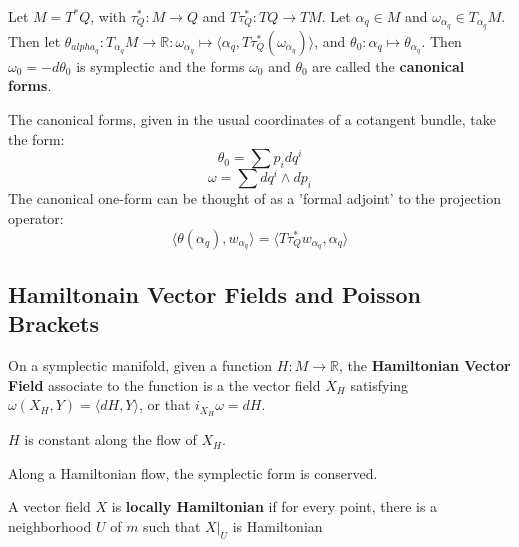 \begin{thm}

Let $M = T^*Q$, with $\tau^*_Q: M \to Q$ and $T\tau^*_Q: TQ \to TM$. Let $\alpha_q \in M$ and $\omega_{\alpha_q} \in T_{\alpha_q}M$. Then let $ \theta_{alpha_q}: T_{\alpha_q}M \to \mathbb{R}: \omega_{\alpha_q} \mapsto \langle \alpha_q, T \tau^*_Q(\omega_{\alpha_q})\rangle  $, and $ \theta_0: \alpha_q \mapsto \theta_{\alpha_q} $. Then $\omega_0 = - d\theta_0$ is symplectic and the forms $\omega_0$ and $ \theta_0 $ are called the \textbf{canonical forms}.

\end{thm}
\indent The canonical forms, given in the usual coordinates of a cotangent bundle, take the form: 
\[\theta_0 = \sum p_i dq^i\]
\[\omega = \sum dq^i \wedge dp_i\]
\indent The canonical one-form can be thought of as a 'formal adjoint' to the projection operator:
\[\langle \theta(\alpha_q), w_{\alpha_q}\rangle  = \langle T\tau^*_Q w_{\alpha_q}, \alpha_q\rangle \]

\subsection{Hamiltonain Vector Fields and Poisson Brackets}



\begin{defn}

On a symplectic manifold, given a function $H: M \to \mathbb{R}$, the \textbf{Hamiltonian Vector Field} associate to the function is a the vector field $X_H$ satisfying $ \omega(X_H, Y) = \langle dH, Y\rangle $, or that $ i_{X_H}\omega = dH$. 

\end{defn}

\begin{prop}

$H$ is constant along the flow of $X_H$.

\end{prop}

\begin{prop}

Along a Hamiltonian flow, the symplectic form is conserved.

\end{prop}

\begin{defn}

A vector field $X$ is \textbf{locally Hamiltonian} if for every point, there is a neighborhood $U$ of $m$ such that $X\vert_U$ is Hamiltonian

\end{defn}

